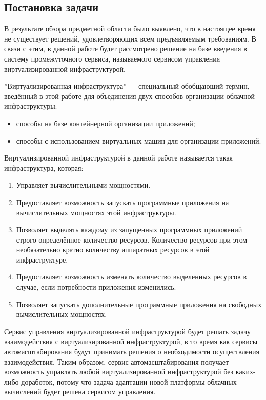 \subsection{Постановка задачи}
\label{formulation}
В результате обзора предметной области было выявлено, что в настоящее время не существует решений, удовлетворяющих всем предъявляемым требованиям.
В связи с этим, в данной работе будет рассмотрено решение на базе введения в систему промежуточного сервиса, называемого сервисом управления виртуализированной инфраструктурой.

''Виртуализированная инфраструктура'' --- специальный обобщающий термин, введённый в этой работе для объединения двух способов организации облачной инфраструктуры:
\begin{itemize}
    \item способы на базе контейнерной организации приложений;
    \item способы с использованием виртуальных машин для организации приложений.
\end{itemize}
Виртуализированной инфраструктурой в данной работе называется такая инфраструктура, которая:
\begin{enumerate}
    \item Управляет вычислительными мощностями.
    \item Предоставляет возможность запускать программные приложения на вычислительных мощностях этой инфраструктуры.
    \item Позволяет выделять каждому из запущенных программных приложений строго определённое количество ресурсов. 
    Количество ресурсов при этом необязательно кратно количеству аппаратных ресурсов в этой инфраструктуре.
    \item Предоставляет возможность изменять количество выделенных ресурсов в случае, если потребности приложения изменились.
    \item Позволяет запускать дополнительные программные приложения на свободных вычислительных мощностях.
\end{enumerate}

Сервис управления виртуализированной инфраструктурой будет решать задачу взаимодействия с виртуализированной инфраструктурой, в то время как сервисы автомасштабирования будут принимать решения о необходимости осуществления взаимодействия.
Таким образом, сервис автомасштабирования получает возможность управлять любой виртуализированной инфраструктурой без каких-либо доработок, потому что задача адаптации новой платформы облачных вычислений будет решена сервисом управления.

